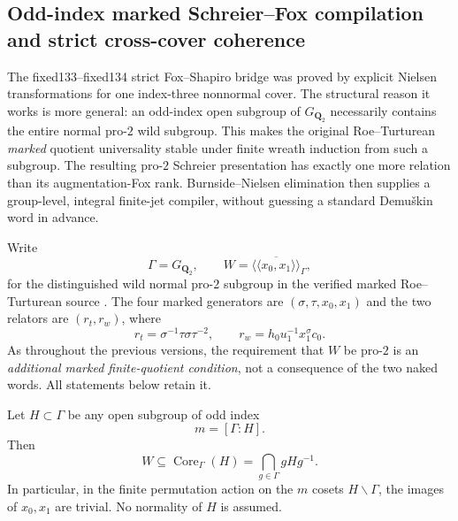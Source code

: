
\subsection{Odd-index marked Schreier--Fox compilation and
strict cross-cover coherence}
\label{subsec:dyadic-f135-odd-sylow-compiler}

The fixed133--fixed134 strict Fox--Shapiro bridge
was proved by explicit Nielsen transformations for
one index-three nonnormal cover.  The structural
reason it works is more general: an odd-index
open subgroup of $G_{\mathbf Q_2}$ necessarily
contains the entire normal pro-$2$ wild
subgroup.  This makes the original
Roe--Turturean \emph{marked} quotient
universality stable under finite
wreath induction from such a subgroup.
The resulting pro-$2$ Schreier presentation
has exactly one more relation than its
augmentation-Fox rank.  Burnside--Nielsen
elimination then supplies a
group-level, integral finite-jet compiler,
without guessing a standard Demu\v{s}kin
word in advance.

Write
\[
\Gamma=G_{\mathbf Q_2},\qquad
W=\overline{\langle\!\langle
x_0,x_1\rangle\!\rangle}_{\Gamma},
\]
for the distinguished wild normal
pro-$2$ subgroup in the verified marked
Roe--Turturean source
\cite{RoeTurtureanGQ2}.
The four marked generators are
$(\sigma,\tau,x_0,x_1)$ and the
two relators are
$(r_t,r_w)$, where
\[
r_t=\sigma^{-1}\tau\sigma\tau^{-2},
\qquad
r_w=h_0u_1^{-1}x_1^\sigma c_0.
\]
As throughout the previous versions,
the requirement that $W$ be pro-$2$
is an \emph{additional marked
finite-quotient condition}, not
a consequence of the two naked words.
All statements below retain it.

\begin{lemma}
\label{lem:dyadic-f135-odd-index-wild-core}
Let $H\subset\Gamma$ be any open
subgroup of odd index
\[
m=[\Gamma:H].
\]
Then
\begin{equation}\label{eq:dyadic-f135-wild-in-core}
\boxed{\qquad
W\subseteq\operatorname{Core}_{\Gamma}(H)
=\bigcap_{g\in\Gamma}gHg^{-1}.
\qquad}
\end{equation}
In particular, in the finite
permutation action on the $m$
cosets $H\backslash\Gamma$,
the images of $x_0,x_1$
are trivial.  No normality of
$H$ is assumed.
\end{lemma}

